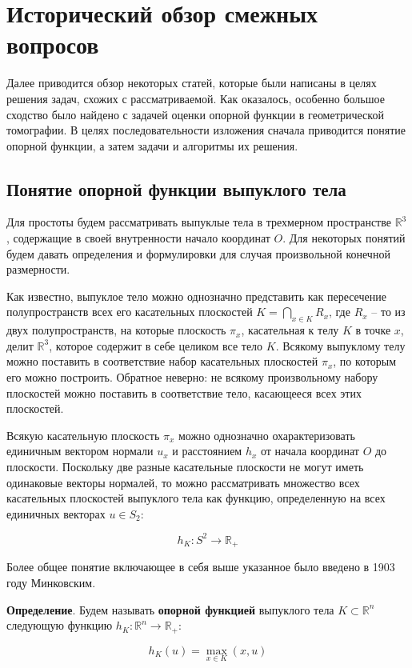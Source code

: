 \documentclass[a4paper,12pt, titlepage]{article}
\begin{document}
\newpage
\section{Исторический обзор смежных вопросов}

Далее приводится обзор некоторых статей, которые были написаны в целях решения
задач, схожих с рассматриваемой. Как оказалось, особенно большое сходство было
найдено с задачей оценки опорной функции в геометрической томографии. В целях
последовательности изложения сначала приводится понятие опорной функции, а
затем задачи и алгоритмы их решения.

\subsection{Понятие опорной функции выпуклого тела}

Для простоты будем рассматривать выпуклые тела в трехмерном пространстве
$\mathbb{R}^{3}$, содержащие в своей внутренности начало координат $O$.
Для некоторых понятий будем давать определения и формулировки для случая
произвольной конечной размерности.

Как известно, выпуклое тело можно однозначно представить как пересечение 
полупространств всех его касательных плоскостей 
$K = \bigcap \limits_{x \in K} R_{x}$, где $R_{x}$ -- то из двух
полупространств, на которые плоскость $\pi_{x}$, касательная к телу $K$ в
точке $x$, делит $\mathbb{R}^{3}$, которое содержит в себе целиком все тело
$K$. Всякому выпуклому телу можно поставить в соответствие набор касательных 
плоскостей $\pi_{x}$, по которым его можно построить. Обратное неверно: не
всякому произвольному набору плоскостей можно поставить в соответствие тело,
касающееся всех этих плоскостей.

Всякую касательную плоскость $\pi_{x}$ можно однозначно охарактеризовать
единичным вектором нормали $u_{x}$ и расстоянием $h_{x}$ от начала координат 
$O$ до плоскости. Поскольку две разные касательные плоскости не могут иметь
одинаковые векторы нормалей, то можно рассматривать множество всех касательных
плоскостей выпуклого тела как функцию, определенную на всех единичных векторах
$u \in S_{2}$:

$$h_{K}: S^{2} \to \mathbb{R}_{+}$$

Более общее понятие включающее в себя выше указанное было введено в 1903 году
Минковским.

\begin{flushleft}
\textbf{Определение}. Будем называть \textbf{опорной функцией} выпуклого тела
$K \subset \mathbb{R}^{n}$ следующую функцию 
$h_{K}: \mathbb{R}^{n} \to \mathbb{R}_{+}$:

$$h_{K}(u) = \max \limits_{x \in K}(x, u)$$
\end{flushleft}
\end{document}
